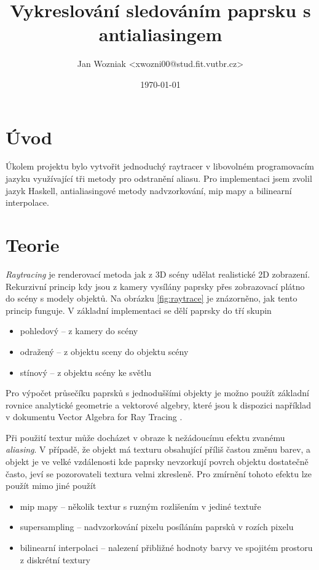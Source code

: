 \documentclass[a4paper, 12pt]{article}
\title{Vykreslování sledováním paprsku s antialiasingem}
\author{Jan Wozniak <xwozni00@stud.fit.vutbr.cz>}
\date{\today}
\begin{document}
\maketitle

\section{Úvod}

Úkolem projektu bylo vytvořit jednoduchý raytracer v libovolném programovacím jazyku využívající tři metody pro odstranění aliasu.
Pro implementaci jsem zvolil jazyk Haskell, antialiasingové metody nadvzorkování, mip mapy a bilinearní interpolace.



\section{Teorie}

\textit{Raytracing} je renderovací metoda jak z 3D scény udělat realistické 2D zobrazení. Rekurzivní princip kdy jsou z kamery vysílány paprsky
přes zobrazovací plátno do scény s modely objektů. 
Na obrázku \ref{fig:raytrace} je znázorněno, jak tento princip funguje.
V základní implementaci se dělí paprsky do tří skupin
\begin{itemize}
\item pohledový -- z kamery do scény
\item odražený -- z objektu sceny do objektu scény
\item stínový -- z objektu scény ke světlu
\end{itemize}

Pro výpočet průsečíku paprsků s jednoduššími objekty je možno použít základní rovnice analytické geometrie a vektorové algebry, které 
jsou k dispozici například v dokumentu Vector Algebra for Ray Tracing \cite{vectoralgerba}.

Při použití textur může docházet v obraze k nežádoucímu efektu zvanému \textit{aliasing}. 
V případě, že objekt má texturu obsahující příliš častou změnu barev, 
a objekt je ve velké vzdálenosti kde paprsky nevzorkují povrch objektu dostatečně často, jeví
se pozorovateli textura velmi zkresleně. Pro zmírnění tohoto efektu lze použít mimo jiné použít
\begin{itemize}
\item mip mapy -- několik textur s ruzným rozlišením v jediné textuře
\item supersampling -- nadvzorkování pixelu posíláním paprsků v rozích pixelu
\item bilinearní interpolaci -- nalezení přibližné hodnoty barvy ve spojitém prostoru z diskrétní textury
\end{itemize}
\end{document}
